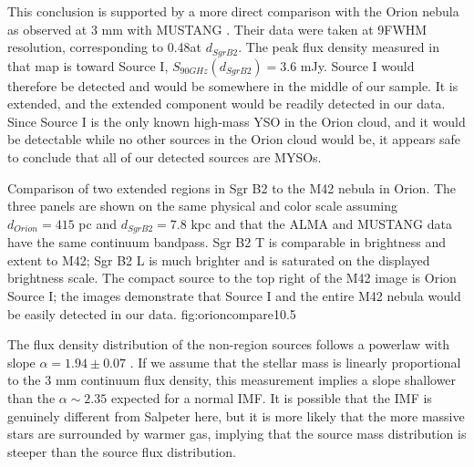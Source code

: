 \documentclass{emulateapj}
\begin{document}
This conclusion is supported by a more direct comparison with the Orion nebula
as observed at 3 mm with MUSTANG \citep[][Figure
\ref{fig:orioncompare}]{Dicker2009a}.  Their data were taken at
9\arcsec FWHM resolution, corresponding to 0.48\arcsec at $d_{Sgr B2}$.  The
peak flux density measured in that map is toward Source I, $S_{90 GHz}(d_{Sgr
B2}) = 3.6$ mJy.  Source I would therefore  be detected and would be
somewhere in the middle of our sample.  It is  extended, and the
extended component would be readily detected in our data. 
Since Source I is the only known high-mass YSO in the Orion cloud, and it would
be detectable while no other sources in the Orion cloud would be, it appears
safe to conclude that all of our detected sources are MYSOs.


{Comparison of two extended \hii regions in Sgr B2 to the M42 nebula in Orion.
The three panels are shown on the same physical and color scale assuming
$d_{Orion} = 415$ pc and $d_{Sgr B2} = 7.8$ kpc and that the ALMA and MUSTANG
data have the same continuum bandpass.  Sgr B2 \hii T is comparable in
brightness and extent to M42; Sgr B2 \hii L is much brighter and is saturated
on the displayed brightness scale.  The compact source to the top right of the
M42 image is Orion Source I; the images demonstrate that Source I and the entire
M42 nebula would be easily detected in our data.
}
{fig:orioncompare}{1}{0.5\textwidth}


The flux density distribution of the non-\hii region sources follows a powerlaw
with slope $\alpha=1.94\pm0.07$ \citep[fitted with the MLE method
of][]{Clauset2007a}.  If we assume that the stellar mass is linearly
proportional to the 3 mm continuum flux density, this measurement implies a
slope shallower than the $\alpha\sim2.35$ expected for a normal IMF.  It is
possible that the IMF is genuinely different from Salpeter here, but it is more
likely that the more massive stars are surrounded by warmer gas, implying that
the source mass distribution is steeper than the source flux distribution.
\end{document}
